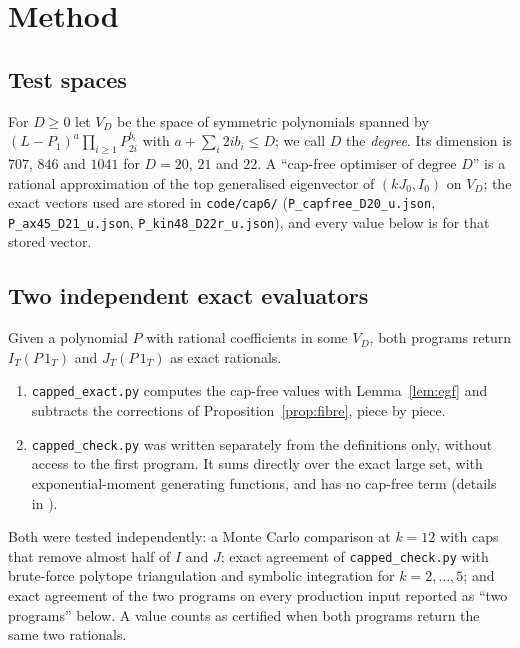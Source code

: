\documentclass[11pt]{amsart}
\theoremstyle{definition}
\theoremstyle{remark}
\begin{document}
\section{Method}

\subsection*{Test spaces}
For $D\ge0$ let $V_D$ be the space of symmetric polynomials spanned by
$(L-P_1)^a\prod_{i\ge1}P_{2i}^{b_i}$ with $a+\sum_i2ib_i\le D$; we call $D$
the \emph{degree}. Its dimension is $707$, $846$ and $1041$ for $D=20$, $21$
and $22$. A ``cap-free optimiser of degree $D$'' is a rational approximation
of the top generalised eigenvector of $(kJ_0,I_0)$ on $V_D$; the exact vectors
used are stored in \texttt{code/cap6/} (\texttt{P\_capfree\_D20\_u.json},
\texttt{P\_ax45\_D21\_u.json}, \texttt{P\_kin48\_D22r\_u.json}), and every value
below is for that stored vector.

\subsection*{Two independent exact evaluators}
Given a polynomial $P$ with rational coefficients in some $V_D$, both
programs return $I_T(P\,1_T)$ and $J_T(P\,1_T)$ as exact rationals.
\begin{enumerate}
\item \texttt{capped\_exact.py} computes the cap-free values with
Lemma~\ref{lem:egf} and subtracts the corrections of
Proposition~\ref{prop:fibre}, piece by piece.
\item \texttt{capped\_check.py} was written separately from the definitions
only, without access to the first program. It sums directly over the exact
large set, with exponential-moment generating functions, and has no cap-free
term (details in \cite[\S5]{Kim26}).
\end{enumerate}
Both were tested independently: a Monte Carlo comparison at $k=12$ with caps
that remove almost half of $I$ and $J$; exact agreement of
\texttt{capped\_check.py} with brute-force polytope triangulation and symbolic
integration for $k=2,\dots,5$; and exact agreement of the two programs on every
production input reported as ``two programs'' below. A value counts as
certified when both programs return the same two rationals.
\end{document}

